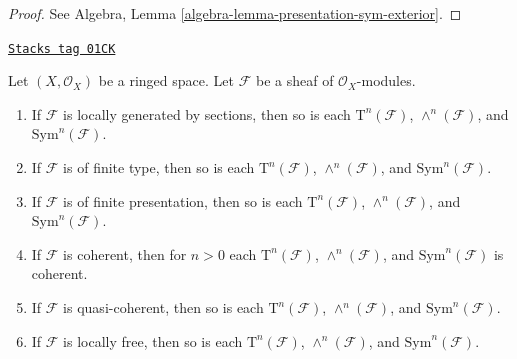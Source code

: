 \begin{proof}
See Algebra, Lemma \ref{algebra-lemma-presentation-sym-exterior}.
\end{proof}

\begin{lemma}
\label{modules-lemma-tensor-algebra-permanence}
\href{https://stacks.math.columbia.edu/tag/01CK}{\texttt{Stacks tag 01CK}}

Let $(X, \mathcal{O}_X)$ be a ringed space.
Let $\mathcal{F}$ be a sheaf of $\mathcal{O}_X$-modules.
\begin{enumerate}
\item If $\mathcal{F}$ is locally generated by sections,
then so is each $\text{T}^n(\mathcal{F})$,
$\wedge^n(\mathcal{F})$, and $\text{Sym}^n(\mathcal{F})$.
\item If $\mathcal{F}$ is of finite type,
then so is each $\text{T}^n(\mathcal{F})$,
$\wedge^n(\mathcal{F})$, and $\text{Sym}^n(\mathcal{F})$.
\item If $\mathcal{F}$ is of finite presentation,
then so is each $\text{T}^n(\mathcal{F})$,
$\wedge^n(\mathcal{F})$, and $\text{Sym}^n(\mathcal{F})$.
\item If $\mathcal{F}$ is coherent,
then for $n > 0$ each $\text{T}^n(\mathcal{F})$,
$\wedge^n(\mathcal{F})$, and $\text{Sym}^n(\mathcal{F})$
is coherent.
\item If $\mathcal{F}$ is quasi-coherent,
then so is each $\text{T}^n(\mathcal{F})$,
$\wedge^n(\mathcal{F})$, and $\text{Sym}^n(\mathcal{F})$.
\item If $\mathcal{F}$ is locally free,
then so is each $\text{T}^n(\mathcal{F})$,
$\wedge^n(\mathcal{F})$, and $\text{Sym}^n(\mathcal{F})$.
\end{enumerate}
\end{lemma}

